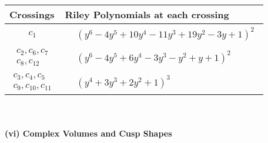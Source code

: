 \documentclass[1p]{elsarticle_modified}
\theoremstyle{definition}
\begin{document}
\begin{tabular}{m{50pt}|m{274pt}}
Crossings & \hspace{64pt}Riley Polynomials at each crossing \\
\hline $$\begin{aligned}c_{1}\end{aligned}$$&$\begin{aligned}
&(y^6-4 y^5+10 y^4-11 y^3+19 y^2-3 y+1)^2
\end{aligned}$\\
\hline $$\begin{aligned}c_{2},c_{6},c_{7}\\c_{8},c_{12}\end{aligned}$$&$\begin{aligned}
&(y^6-4 y^5+6 y^4-3 y^3- y^2+y+1)^2
\end{aligned}$\\
\hline $$\begin{aligned}c_{3},c_{4},c_{5}\\c_{9},c_{10},c_{11}\end{aligned}$$&$\begin{aligned}
&(y^4+3 y^3+2 y^2+1)^3
\end{aligned}$\\
\hline
\end{tabular}\\~\\
\newpage\flushleft \textbf{(vi) Complex Volumes and Cusp Shapes}
\end{document}
